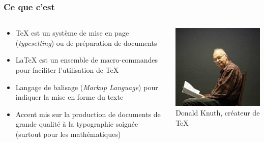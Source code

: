 \begin{frame}
  \frametitle{Ce que c'est}
  \begin{columns}
    \begin{column}{.5\textwidth}
      \begin{itemize}
      \item {\TeX} est un système de mise en page (\emph{typesetting})
        ou de préparation de documents
      \item {\LaTeX} est un ensemble de macro-commandes pour faciliter
        l'utilisation de {\TeX}
      \item Langage de balisage (\emph{Markup Language}) pour indiquer
        la mise en forme du texte
      \item Accent mis sur la production de documents de grande
        qualité à la typographie soignée (surtout pour les
        mathématiques)
      \end{itemize}
    \end{column}
    \begin{column}{.5\textwidth}
      \centering
      \includegraphics[width=\linewidth]{Knuth} \\
      \footnotesize Donald Knuth, créateur de \TeX
    \end{column}
  \end{columns}
\end{frame}

